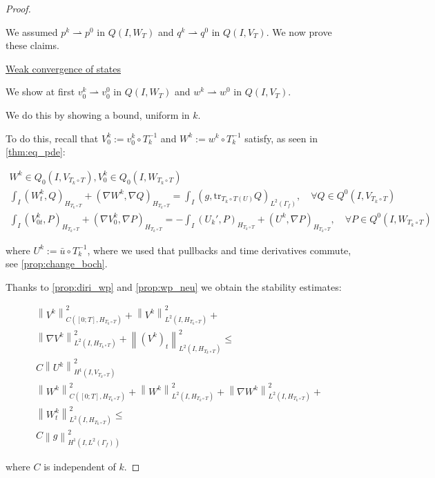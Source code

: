 \documentclass[english,a4paper,12pt,oneside]{scrbook}
\theoremstyle{break}
\newenvironment{mproof}[1][\proofname]{%
  \begin{proof}[#1]$ $\par\nobreak\ignorespaces
}{%
  \end{proof}
}
\renewcommand*{\proofname}{Proof}
\theoremstyle{remark}
\newcommand{\norm}[1]{\left\lVert#1\right\rVert}
\newcommand{\tr}{\text{tr}}
\newcommand{\weakc}{\rightharpoonup}
\begin{document}
\begin{mproof}
We assumed $p^k \weakc p^0$ in $Q(I,W_T)$ and $q^k \weakc q^0$ in $Q(I,V_T)$. We now prove these claims.

\underline{Weak convergence of states}

We show at first  $v_0^k \weakc v^0_0$ in $Q(I,W_T)$ and $w^k \weakc w^0$ in $Q(I,V_T)$.

We do this by showing a bound, uniform in $k$.

To do this, recall that $V_0^k:=v_0^k\circ T_k^{-1}$ and $W^k:=w^k\circ T_k^{-1}$ satisfy, as seen in \ref{thm:eq_pde}:

\begin{align*}
W^k \in Q_0(I, V_{T_k\circ T}), V_0^k \in Q_0(I,W_{T_k\circ T}) \\
\int_I  (W^k_t , Q)_{H_{T_k\circ T}}+ (\nabla W^k, \nabla Q)_{H_{T_k\circ T}} = \int_I(g,\tr_{{T_k\circ T}(U)} Q)_{L^2(\Gamma_f)}, \quad \forall Q \in Q^0(I, V_{T_k\circ T}) \\
\int_I (V^k_{0t},P)_{H_{T_k\circ T}} + (\nabla V_0^k, \nabla P)_{H_{T_k\circ T}}= -\int_I(U_k',P)_{H_{T_k\circ T}}+(U^k, \nabla P)_{H_{T_k\circ T}}, \quad \forall P \in Q^0(I, W_{T_k\circ T})
\end{align*}

where $U^k:=\bar{u}\circ T_k^{-1}$, where we used that pullbacks and time derivatives commute, see \cref{prop:change_boch}.

Thanks to \cref{prop:diri_wp} and \cref{prop:wp_neu} we obtain the stability estimates:

\begin{align*}
\norm{V^k}^2_{C([0;T],H_{T_k\circ T})}+\norm{V^k}_{L^2(I,H_{T_k\circ T})}^2+ \\\norm{\nabla V^k}_{L^2(I,H_{T_k\circ T})}^2 + \norm{(V^k)_t}^2_{L^2(I,H_{T_k\circ T})}\leq\\ C\norm{U^k}_{H^1(I,V_{T_k\circ T})}^2\\
\norm{W^k}^2_{C([0;T],H_{T_k\circ T})}+\norm{W^k}_{L^2(I,H_{T_k\circ T})}^2+ \norm{\nabla W^k}_{L^2(I,H_{T_k\circ T})}^2 +\\ \norm{W^k_t}^2_{L^2(I,H_{T_k\circ T})}\leq \\C\norm{g}_{H^1(I,L^2(\Gamma_f))}^2
\end{align*}


where $C$ is independent of $k$.



\end{mproof}
\end{document}
